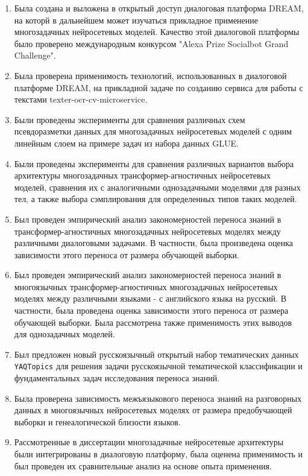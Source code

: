 {\novelty}
\begin{enumerate}
  \item {Была создана и выложена в открытый доступ диалоговая платформа DREAM, на которй в дальнейшем может изучаться прикладное применение многозадачных нейросетевых моделей. Качество этой диалоговой платформы было проверено международным конкурсом "Alexa Prize Socialbot Grand Challenge".}
  \item {Была проверена применимость технологий, использованных в диалоговой платформе DREAM, на прикладной задаче по созданию сервиса для работы с текстами texter-ocr-cv-microservice.}
  \item {Были проведены эксперименты для сравнения различных схем псевдоразметки данных для многозадачных нейросетевых моделей с одним линейным слоем на примере задач из набора данных GLUE.}
  \item {Были проведены эксперименты для сравнения различных вариантов выбора архитектуры многозадачных трансформер-агностичных нейросетевых моделей, сравнения их с аналогичными однозадачными моделями для разных тел, а также выбора сэмплирования для определенных типов таких моделей.}
  \item {Был проведен эмпирический анализ закономерностей переноса знаний в трансформер-агностичных многозадачных нейросетевых моделях между различными диалоговыми задачами. В частности, была произведена оценка зависимости этого переноса от размера обучающей выборки.}
  \item {Был проведен эмпирический анализ закономерностей переноса знаний в многоязычных трансформер-агностичных многозадачных нейросетевых моделях между различными языками - с английского языка на русский. В частности, была проведена оценка зависимости этого переноса от размера обучающей выборки. Была рассмотрена также применимость этих выводов для однозадачных моделей.}
  \item {Был предложен новый русскоязычный открытый набор тематических данных \texttt{YAQTopics} для решения задачи русскоязычной тематической классификации и фундаментальных задач исследования переноса знаний.}
  \item {Была проверена зависимость межъязыкового переноса знаний на разговорных данных в многоязычных нейросетевых моделях от размера предобучающей выборки и генеалогической близости языков.}
  \item {Рассмотренные в диссертации многозадачные нейросетевые архитектуры были интегрированы в диалоговую платформу, была оценена применимость и был проведен их сравнительные анализ на основе опыта применения.}
\end{enumerate}

